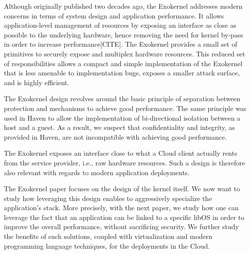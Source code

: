 Although originally published two decades ago, the Exokernel addresses modern concerns in terms of system design and application performance.
It allows application-level management of resources by exposing an interface as close as possible to the underlying hardware, hence removing the need for kernel by-pass in order to increase performance[CITE].
The Exokernel provides a small set of primitives to securely expose and multiplex hardware resources.
This reduced set of responsibilities allows a compact and simple implementation of the Exokernel that is less amenable to implementation bugs, exposes a smaller attack surface, and is highly efficient.

The Exokernel design revolves around the basic principle of separation between protection and mechanisms to achieve good performance.
The same principle was used in Haven to allow the implementation of bi-directional isolation between a host and a guest.
As a result, we suspect that confidentiality and integrity, as provided in Haven, are not incompatible with achieving good performance.

The Exokernel exposes an interface close to what a Cloud client actually rents from the service provider, i.e., raw hardware resources.
Such a design is therefore also relevant with regards to modern application deployments. 

The Exokernel paper focuses on the design of the kernel itself.
We now want to study how leveraging this design enables to aggressively specialize the application's stack.
More precisely, with the next paper, we study how one can leverage the fact that an application can be linked to a specific libOS in order to improve the overall performance, without sacrificing security.
We further study the benefits of such solutions, coupled with virtualization and modern programming language techniques, for the deployments in the Cloud.